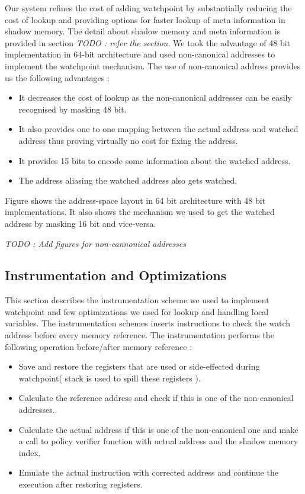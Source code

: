 Our system refines the cost of adding watchpoint by substantially reducing the cost of lookup and providing options for faster lookup of meta information in shadow memory. The detail about shadow memory and meta information is provided in section \emph{TODO : refer the section}. We took the advantage of 48 bit implementation in 64-bit architecture and used non-canonical addresses to implement the watchpoint mechanism. The use of non-canonical address provides us the following advantages :
\begin{itemize}
	\item It decreases the cost of lookup as the non-canonical addresses can be easily recognised by masking 48 bit.
	\item It also provides one to one mapping between the actual address and watched address thus proving virtually no cost for fixing the address.
	\item It provides 15 bits to encode some information about the watched address.
	\item The address aliasing the watched address also gets watched.
\end{itemize}   

Figure shows the address-space layout in 64 bit architecture with 48 bit implementations. It also shows the mechanism we used to get the watched address by masking 16 bit and vice-versa.

\emph{TODO : Add figures for non-cannonical addresses}


\subsection {Instrumentation and Optimizations}

This section describes the instrumentation scheme we used to implement watchpoint and few optimizations we used for lookup and handling local variables. The instrumentation schemes inserts instructions to check the watch address before every memory reference. The instrumentation performs the following operation before/after memory reference :

\begin{itemize}
\item Save and restore the registers that are used or side-effected during watchpoint( stack is used to spill these registers ).
\item Calculate the reference address and check if this is one of the non-canonical addresses.
\item Calculate the actual address if this is one of the non-canonical one and make a call to policy verifier function with actual address and the shadow memory index. 
\item Emulate the actual instruction with corrected address and continue the execution after restoring registers.
\end{itemize}

